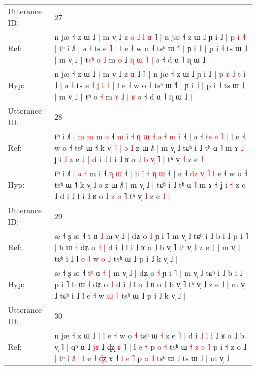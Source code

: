 \documentclass[10pt]{article}
\DeclareRobustCommand{\hl}[1]{{\textcolor{red}{#1}}}
\begin{document}
\begin{longtable}{ll}
 \\
\midrule
Utterance ID: & 27 \\
Ref: & n jæ ˧ z ɯ ˩ | m v̩ ˩ z \hl{o} ˩\hl{ }\hl{l}\hl{ }\hl{ɑ} ˥ | n jæ ˧ z ɯ ˩ ɲ i ˩ | p\hl{ }\hl{i} \hl{˧} \hl{|} t\hl{ʰ} i ˩\hl{˥} | ə ˧ ts e\hl{}\hl{}\hl{}\hl{}\hl{}\hl{} \hl{˥} | l e ˧ w o ˧ tsʰ ɯ ˧˥ | ɲ i ˩ | p i ˧ ts ɯ ˩ | m v̩ ˩ | t\hl{s}ʰ o \hl{˩} m \hl{o} ˩\hl{ }\hl{ɳ}\hl{ }\hl{ɯ} \hl{˥} \hl{|} ə ˧ d ɑ ˥ ɳ ɯ ˩ |
 \\
Hyp: & n jæ ˧ z ɯ ˩ | m v̩ ˩ z \hl{ɑ} ˩\hl{}\hl{}\hl{}\hl{} ˥ | n jæ ˧ z ɯ ˩ ɲ i ˩ | p\hl{}\hl{} \hl{ɤ} \hl{˩} t\hl{} i ˩\hl{} | ə ˧ ts e\hl{ }\hl{˧}\hl{ }\hl{ʝ}\hl{ }\hl{i} \hl{˧} | l e ˧ w o ˧ tsʰ ɯ ˧˥ | ɲ i ˩ | p i ˧ ts ɯ ˩ | m v̩ ˩ | t\hl{}ʰ o \hl{˧} m \hl{ɤ} ˩\hl{}\hl{}\hl{}\hl{} \hl{|} \hl{ʁ} ə ˧ d ɑ ˥ ɳ ɯ ˩ |
 \\
\midrule
Utterance ID: & 28 \\
Ref: & tʰ i ˩˥ | \hl{m} \hl{m} m \hl{ə} ˧ \hl{m} \hl{i} ˧ \hl{ɳ} \hl{ɯ} \hl{˧}\hl{ }\hl{ə} ˧ \hl{m} \hl{i} ˧ | ə ˧ \hl{t}\hl{s} \hl{e}\hl{ }\hl{˥} \hl{|} l e ˧ w o ˧ tsʰ ɯ ˧\hl{} k v̩\hl{ }\hl{˥} \hl{|} ə\hl{ }\hl{˩} z ɯ ˩˥ | m v̩ ˩\hl{}\hl{} tɕʰ i ˩ tʰ ɑ ˥ m ɤ \hl{˩} ʝ i \hl{˩} z e ˩\hl{ }\hl{|} d i ˩ l i ˩ ʁ o ˩ \hl{b} \hl{v}\hl{̩} ˥\hl{ }\hl{|} tʰ v̩ \hl{˧} z e \hl{˧} |
 \\
Hyp: & tʰ i ˩˥ | \hl{ə} \hl{˧} m \hl{i} ˧ \hl{ɳ} \hl{ɯ} ˧ \hl{|} \hl{h} \hl{}\hl{i}\hl{̃} ˧ \hl{ɳ} \hl{ɯ} ˧ | ə ˧ \hl{d}\hl{z} \hl{}\hl{v}\hl{̩} \hl{˥} l e ˧ w o ˧ tsʰ ɯ ˧\hl{˥} k v̩\hl{}\hl{} \hl{˩} ə\hl{}\hl{} z ɯ ˩˥ | m v̩ ˩\hl{ }\hl{|} tɕʰ i ˩ tʰ ɑ ˥ m ɤ \hl{˧} ʝ i \hl{˧} z e ˩\hl{}\hl{} d i ˩ l i ˩ ʁ o ˩ \hl{z} \hl{}\hl{o} ˥\hl{}\hl{} tʰ v̩ \hl{˩} z e \hl{˩} |
 \\
\midrule
Utterance ID: & 29 \\
Ref: & æ ˧ ʂ æ ˧ t\hl{} ɑ\hl{}\hl{} \hl{˩} m v̩ ˩ | dʑ o \hl{˩} ɲ i ˥\hl{}\hl{} m v̩ ˩ tɕʰ i ˩ b i ˩ p i ˥\hl{ }\hl{|} h ɯ ˧ dʑ o\hl{ }\hl{˧} \hl{|} d i ˩ l \hl{i} ˩ ʁ o ˩ b v̩ ˥ tʰ v̩ ˩ z e ˩ | m v̩ ˩ tɕʰ i ˩ l e \hl{˥} w \hl{o} \hl{˩} tsʰ ɯ ˩ p i ˩ k v̩ ˩ |
 \\
Hyp: & æ ˧ ʂ æ ˧ t\hl{ʰ} ɑ\hl{ }\hl{˧} \hl{|} m v̩ ˩ | dʑ o \hl{˧} ɲ i ˥\hl{ }\hl{|} m v̩ ˩ tɕʰ i ˩ b i ˩ p i ˥\hl{}\hl{} h ɯ ˧ dʑ o\hl{}\hl{} \hl{˩} d i ˩ l \hl{o} ˩ ʁ o ˩ b v̩ ˥ tʰ v̩ ˩ z e ˩ | m v̩ ˩ tɕʰ i ˩ l e \hl{˧} w \hl{ɯ} \hl{˥} tsʰ ɯ ˩ p i ˩ k v̩ ˩ |
 \\
\midrule
Utterance ID: & 30 \\
Ref: & n jæ ˧ z ɯ ˩ |\hl{ }\hl{l} e ˧ w o \hl{˧} tsʰ ɯ \hl{˧} z e\hl{ }\hl{˥} \hl{|} d i \hl{˩} l i ˩ ʁ o ˩ b v̩ ˥\hl{ }\hl{|} qʰ ɑ ˩ \hl{}\hl{j}\hl{ɤ} ˩ ɖʐ \hl{ɤ} ˥ | l e \hl{˧} p\hl{ }\hl{o} \hl{˧} tsʰ ɯ \hl{˧} \hl{z} \hl{e} \hl{˥} p i ˧ z o ˩\hl{ }\hl{|} tʰ i \hl{˩}˥ | l e ˧ \hl{ɖ}ʐ ɤ ˧ \hl{l}\hl{ }\hl{e} \hl{˥} p \hl{o} \hl{˩} tsʰ ɯ ˩ ts ɯ ˩ | m v̩ ˩

\end{longtable}
\end{document}
